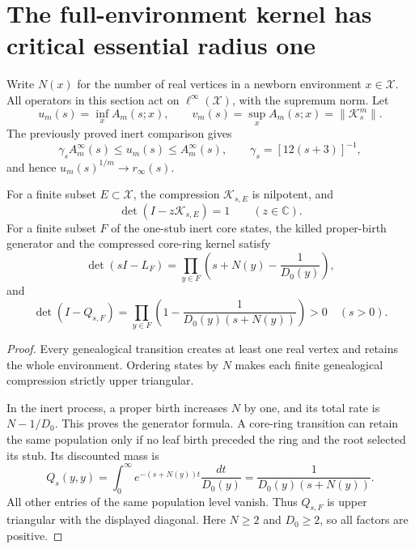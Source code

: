 
\section{The full-environment kernel has critical essential radius one}
\label{ess:section}

Write $N(x)$ for the number of real vertices in a newborn environment
$x\in\mathcal X$.  All operators in this section act on
$\ell^\infty(\mathcal X)$, with the supremum norm.  Let
\[
 u_m(s)=\inf_x A_m(s;x),\qquad
 v_m(s)=\sup_x A_m(s;x)=\|\mathcal K_s^m\|.
\]
The previously proved inert comparison gives
\[
 \gamma_s A_m^\infty(s)\le u_m(s)\le A_m^\infty(s),
 \qquad \gamma_s=[12(s+3)]^{-1},
\]
and hence $u_m(s)^{1/m}\longrightarrow r_\infty(s)$.

\begin{proposition}\label{ess:finite}
For a finite subset $E\subset\mathcal X$, the compression
$\mathcal K_{s,E}$ is nilpotent, and
\[
 \det(I-z\mathcal K_{s,E})=1 \qquad(z\in\mathbb C).
\]
For a finite subset $F$ of the one-stub inert core states, the killed
proper-birth generator and the compressed core-ring kernel satisfy
\[
 \det(sI-L_F)
 =\prod_{y\in F}\left(s+N(y)-\frac1{D_0(y)}\right),
\]
and
\[
 \det(I-Q_{s,F})
 =\prod_{y\in F}\left(1-\frac1{D_0(y)(s+N(y))}\right)>0
 \quad(s>0).
\]
\end{proposition}
\begin{proof}
Every genealogical transition creates at least one real vertex and
retains the whole environment.  Ordering states by $N$ makes each
finite genealogical compression strictly upper triangular.

In the inert process, a proper birth increases $N$ by one, and its
total rate is $N-1/D_0$.  This proves the generator formula.  A
core-ring transition can retain the same population only if no leaf
birth preceded the ring and the root selected its stub.  Its discounted
mass is
\[
 Q_s(y,y)=\int_0^\infty e^{-(s+N(y))t}\frac{dt}{D_0(y)}
 =\frac1{D_0(y)(s+N(y))}.
\]
All other entries of the same population level vanish.  Thus $Q_{s,F}$
is upper triangular with the displayed diagonal.  Here $N\ge2$ and
$D_0\ge2$, so all factors are positive.
\end{proof}


